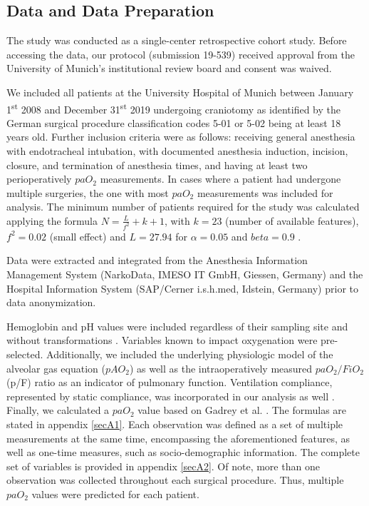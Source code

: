 \documentclass[referee,lineno,pdflatex,sn-nature]{sn-jnl}%
\theoremstyle{thmstyleone}%
\theoremstyle{thmstyletwo}%
\theoremstyle{thmstylethree}%
\begin{document}
\subsection{Data and Data Preparation}\label{sec2.1}
The study was conducted as a single-center retrospective cohort study.  Before accessing the data, our protocol (submission 19-539) received approval from the University of Munich’s institutional review board and consent was waived. 

We included all patients at the University Hospital of Munich between January 1\textsuperscript{st} 2008 and December 31\textsuperscript{st} 2019 undergoing craniotomy as identified by the German surgical procedure classification \cite{Stausberg1998} codes 5-01 or 5-02 being at least 18 years old. Further inclusion criteria were as follows: receiving general anesthesia with endotracheal intubation, with documented anesthesia induction, incision, closure, and termination of anesthesia times, and having at least two perioperatively $paO_2$ measurements. In cases where a patient had undergone multiple surgeries, the one with most $paO_2$ measurements was included for analysis. The minimum number of patients required for the study was calculated applying the formula $N=\frac{L}{f^2}+k+1$, with $k=23$ (number of available features), $f^2=0.02$ (small effect) and $L=27.94$ for $\alpha=0.05$ and $beta=0.9$ \cite{Cohen2013a, Cohen2013b}.

Data were extracted and integrated from the Anesthesia Information Management System (NarkoData\textregistered, IMESO IT GmbH, Giessen, Germany) and the Hospital Information System (SAP/Cerner i.s.h.med, Idstein, Germany) prior to data anonymization.

Hemoglobin and pH values were included regardless of their sampling site and without transformations \cite{AlEnezi2015,ref24}. Variables known to impact oxygenation were pre-selected. Additionally, we included the underlying physiologic model of the alveolar gas equation ($pAO_2$) \cite{Sharma2019} as well as the intraoperatively measured $paO_2/FiO_2$ (p/F) ratio as an indicator of pulmonary function. Ventilation compliance, represented by static compliance, was incorporated in our analysis as well \cite{Desai2019}. Finally, we calculated a $paO_2$ value based on Gadrey et al. \cite{Gadrey2019}. The formulas are stated in appendix \ref{secA1}. Each observation was defined as a set of multiple measurements at the same time, encompassing the aforementioned features, as well as one-time measures, such as socio-demographic information. The complete set of variables is provided in appendix \ref{secA2}. Of note, more than one observation was collected throughout each surgical procedure. Thus, multiple $paO_2$ values were predicted for each patient.
\end{document}
